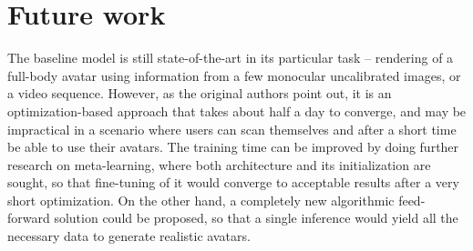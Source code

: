 
\section{Future work}\label{res:future}

The baseline model \cite{dnn:stylepeople21} is still state-of-the-art in its particular task -- rendering of a full-body avatar using information from a few monocular uncalibrated images, or a video sequence. However, as the original authors point out, it is an optimization-based approach that takes about half a day to converge, and may be impractical in a scenario where users can scan themselves and after a short time be able to use their avatars. The training time can be improved by doing further research on meta-learning, where both architecture and its initialization are sought, so that fine-tuning of it would converge to acceptable results after a very short optimization. On the other hand, a completely new algorithmic feed-forward solution could be proposed, so that a single inference would yield all the necessary data to generate realistic avatars.

